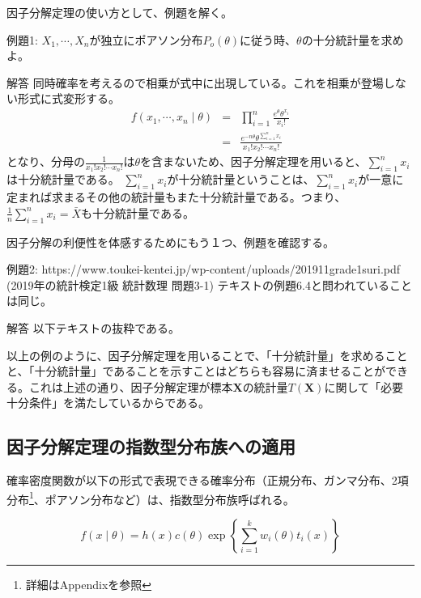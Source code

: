 \documentclass[a4paper,uplatex]{jsarticle}
\begin{document}
\vspace{\baselineskip}
因子分解定理の使い方として、例題を解く。

例題1: $X_1,\cdots , X_n$が独立にポアソン分布$P_o(\theta)$に従う時、$\theta$の十分統計量を求めよ。

\begin{itembox}[c]{解答}
同時確率を考えるので相乗が式中に出現している。これを相乗が登場しない形式に式変形する。
\begin{eqnarray}
f(x_1, \cdots, x_n \mid \theta) &=& \prod_{i=1}^n \frac{e^{\theta}\theta^{x_i}}{x_{i}!} \nonumber\\
&=& \frac{e^{-n\theta}\theta^{\sum_{i=1} ^{n}{x_i}}}{x_{1}!x_{2}!\cdots x_{n}!} \nonumber
\end{eqnarray}
となり、分母の$\frac{1}{x_{1}!x_{2}!\cdots x_{n}!}$は$\theta$を含まないため、因子分解定理を用いると、$\sum_{i=1}^{n}{x_i}$は十分統計量である。
$\sum_{i=1}^{n}{x_i}$が十分統計量ということは、$\sum_{i=1}^{n}{x_i}$が一意に定まれば求まるその他の統計量もまた十分統計量である。つまり、$\frac{1}{n}\sum_{i=1}^{n}{x_i} = \bar{X}$も十分統計量である。
\end{itembox}

\vspace{\baselineskip}
因子分解の利便性を体感するためにもう１つ、例題を確認する。

例題2: https://www.toukei-kentei.jp/wp-content/uploads/201911grade1suri.pdf (2019年の統計検定1級 統計数理 問題3-1) テキストの例題6.4と問われていることは同じ。
\begin{itembox}[c]{解答}
以下テキストの抜粋である。
\end{itembox}


以上の例のように、因子分解定理を用いることで、「十分統計量」を求めることと、「十分統計量」であることを示すことはどちらも容易に済ませることができる。これは上述の通り、因子分解定理が標本$\bm{X}$の統計量$T(\bm{X})$に関して「必要十分条件」を満たしているからである。


\subsection{因子分解定理の指数型分布族への適用}
確率密度関数が以下の形式で表現できる確率分布（正規分布、ガンマ分布、2項分布\footnote{詳細はAppendixを参照}、ポアソン分布など）は、指数型分布族呼ばれる。

\begin{equation}
f(x \mid \theta)= h(x)c(\theta)\exp\left\{\sum_{i=1}^{k} w_i(\theta)t_i(x)\right\} \nonumber
\end{equation}
\end{document}
